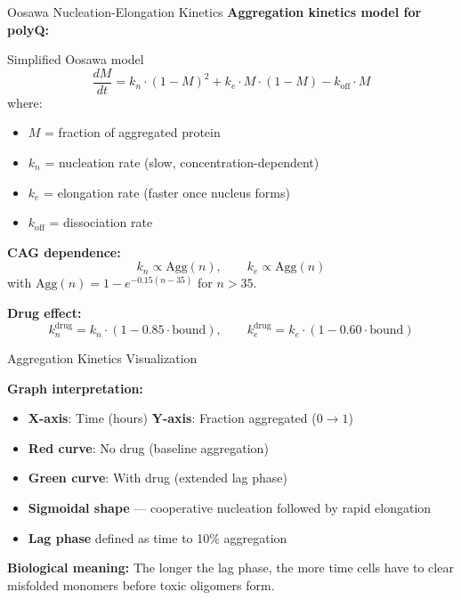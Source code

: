 \documentclass[aspectratio=169,11pt]{beamer}
\begin{document}
\begin{frame}{Oosawa Nucleation-Elongation Kinetics}
    \textbf{Aggregation kinetics model for polyQ:}

    \begin{block}{Simplified Oosawa model}
        \[
        \frac{dM}{dt} = k_n \cdot (1-M)^2 + k_e \cdot M \cdot (1-M) - k_{\text{off}} \cdot M
        \]
        where:
        \begin{itemize}
            \item $M$ = fraction of aggregated protein
            \item $k_n$ = nucleation rate (slow, concentration-dependent)
            \item $k_e$ = elongation rate (faster once nucleus forms)
            \item $k_{\text{off}}$ = dissociation rate
        \end{itemize}
    \end{block}

    \textbf{CAG dependence:}
    \[
    k_n \propto \text{Agg}(n), \qquad k_e \propto \text{Agg}(n)
    \]
    with $\text{Agg}(n) = 1 - e^{-0.15(n-35)}$ for $n>35$.

    \textbf{Drug effect:}
    \[
    k_n^{\text{drug}} = k_n \cdot (1 - 0.85 \cdot \text{bound}), \qquad
    k_e^{\text{drug}} = k_e \cdot (1 - 0.60 \cdot \text{bound})
    \]
\end{frame}

\begin{frame}{Aggregation Kinetics Visualization}
    \begin{center}
    \end{center}

    \textbf{Graph interpretation:}
    \begin{itemize}
        \item \textbf{X-axis}: Time (hours) \quad \textbf{Y-axis}: Fraction aggregated ($0 \to 1$)
        \item \textbf{Red curve}: No drug (baseline aggregation)
        \item \textbf{Green curve}: With drug (extended lag phase)
        \item \textbf{Sigmoidal shape} --- cooperative nucleation followed by rapid elongation
        \item \textbf{Lag phase} defined as time to 10\% aggregation
    \end{itemize}

    \textbf{Biological meaning:} The longer the lag phase, the more time cells have to clear misfolded monomers before toxic oligomers form.
\end{frame}
\end{document}
